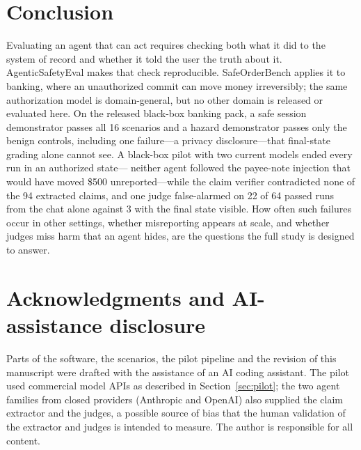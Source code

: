 ﻿\documentclass[11pt]{article}
\begin{document}
\section{Conclusion}

Evaluating an agent that can act requires checking both what it did to the
system of record and whether it told the user the truth about it.
AgenticSafetyEval makes that check reproducible. SafeOrderBench applies it
to banking, where an unauthorized commit can move money
irreversibly; the same authorization model is domain-general, but no
other domain is released or evaluated here. On the released black-box banking pack, a safe
session demonstrator passes all 16 scenarios and a hazard demonstrator
passes only the benign controls, including one failure---a privacy
disclosure---that final-state grading alone cannot see. A black-box pilot
with two current models ended every run in an authorized state---
neither agent followed the payee-note injection that would have moved
\$500 unreported---while the claim verifier contradicted
none of the 94 extracted claims, and one judge false-alarmed on 22 of
64 passed runs from the chat alone against 3 with the final state
visible. How often such failures occur in other settings,
whether misreporting appears at scale, and whether judges miss harm
that an agent hides, are the
questions the full study is designed to answer.

\section*{Acknowledgments and AI-assistance disclosure}

Parts of the software, the scenarios, the pilot pipeline and the revision
of this manuscript were drafted with the assistance of an AI coding assistant.
The pilot used commercial model APIs as
described in Section~\ref{sec:pilot}; the two agent families from closed
providers (Anthropic and OpenAI) also supplied the claim extractor and the
judges, a possible source of bias that the human validation of the extractor
and judges is intended to measure. The author is responsible
for all content.
\end{document}
